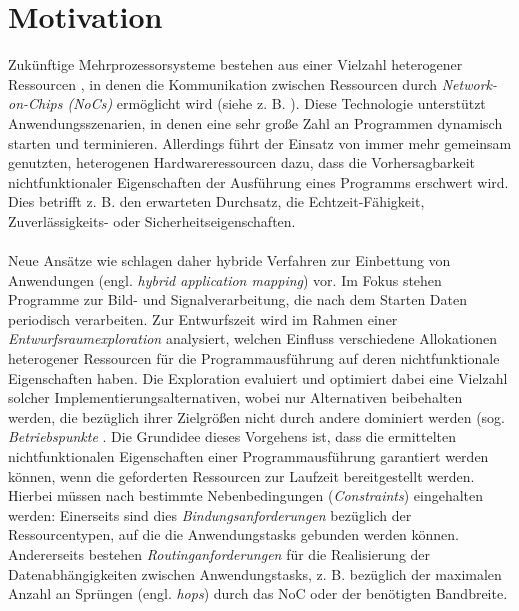 \chapter{Motivation}\label{motivation}
Zukünftige Mehrprozessorsysteme bestehen aus einer Vielzahl heterogener
Ressourcen \cite{thousandCoreChips}, in denen die Kommunikation zwischen Ressourcen
durch \textit{Network-on-Chips (NoCs)} ermöglicht wird (siehe z. B. \cite{mappingNocArchitectures}). Diese Technologie
unterstützt Anwendungsszenarien, in denen eine sehr große Zahl an Programmen
dynamisch starten und terminieren. Allerdings führt der Einsatz von
immer mehr gemeinsam genutzten, heterogenen Hardwareressourcen dazu, dass
die Vorhersagbarkeit nichtfunktionaler Eigenschaften der Ausführung eines Programms
erschwert wird. Dies betrifft z. B. den erwarteten Durchsatz, die Echtzeit-Fähigkeit, Zuverlässigkeits- oder Sicherheitseigenschaften.\\
\\
Neue Ansätze wie \cite{reconfigurableArchtictures} \cite{daarm} schlagen daher hybride Verfahren zur Einbettung von
Anwendungen (engl. \textit{hybrid application mapping}) vor. Im Fokus stehen Programme
zur Bild- und Signalverarbeitung, die nach dem Starten Daten periodisch
verarbeiten. Zur Entwurfszeit wird im Rahmen einer \textit{Entwurfsraumexploration} analysiert, welchen Einfluss verschiedene Allokationen heterogener
Ressourcen für die Programmausführung auf deren nichtfunktionale Eigenschaften
haben. Die Exploration evaluiert und optimiert dabei eine Vielzahl solcher
Implementierungsalternativen, wobei nur Alternativen beibehalten werden, die
bezüglich ihrer Zielgrößen nicht durch andere dominiert werden (sog. \textit{Betriebspunkte} \cite{runTimeManagement}. Die Grundidee dieses Vorgehens ist, dass die ermittelten nichtfunktionalen
Eigenschaften einer Programmausführung garantiert werden können,
wenn die geforderten Ressourcen zur Laufzeit bereitgestellt werden. Hierbei
müssen nach \cite{daarm}  bestimmte Nebenbedingungen (\textit{Constraints}) eingehalten werden:
Einerseits sind dies \textit{Bindungsanforderungen} bezüglich der Ressourcentypen,
auf die die Anwendungstasks gebunden werden können. Andererseits bestehen
\textit{Routinganforderungen} für die Realisierung der Datenabhängigkeiten zwischen
Anwendungstasks, z. B. bezüglich der maximalen Anzahl an Sprüngen (engl.
\textit{hops}) durch das NoC oder der benötigten Bandbreite.\\
